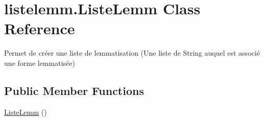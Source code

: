 \hypertarget{classlistelemm_1_1_liste_lemm}{}\section{listelemm.\+Liste\+Lemm Class Reference}
\label{classlistelemm_1_1_liste_lemm}


Permet de créer une liste de lemmatisation (Une liste de String auquel est associé une forme lemmatisée)  


\subsection*{Public Member Functions}
\begin{DoxyCompactItemize}
\item 
\hyperlink{classlistelemm_1_1_liste_lemm_a6ff6b67fd8529f10d08a47c1ad23febd}{Liste\+Lemm} ()\hypertarget{classlistelemm_1_1_liste_lemm_a6ff6b67fd8529f10d08a47c1ad23febd}{}\label{classlistelemm_1_1_liste_lemm_a6ff6b67fd8529f10d08a47c1ad23febd}


\end{DoxyCompactItemize}

